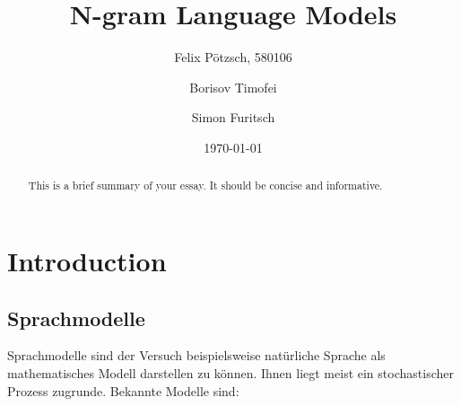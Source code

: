 \documentclass[12pt]{article}
\title{N-gram Language Models}
\author{
  Felix Pötzsch, 580106\\
  \and
  Borisov Timofei \\
  \and
  Simon Furitsch\\
}
\date{\today}
\begin{document}
\maketitle

\begin{abstract}
	This is a brief summary of your essay. It should be concise and informative.
\end{abstract}

\tableofcontents
\clearpage

\section{Introduction}

\subsection{Sprachmodelle}
Sprachmodelle sind der Versuch beispielsweise natürliche Sprache als mathematisches 
Modell darstellen zu können. Ihnen liegt meist ein stochastischer Prozess zugrunde. 
Bekannte Modelle sind:
\end{document}
